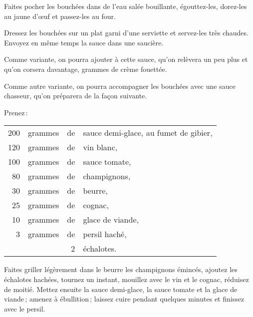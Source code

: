 Faites pocher les bouchées dans de l'eau salée bouillante, égouttez-les,
dorez-les au jaune d'œuf et passez-les au four.

Dressez les bouchées sur un plat garni d'une serviette et servez-les très
chaudes. Envoyez en même temps la sauce dans une saucière.

\sk

Comme variante, on pourra ajouter à cette sauce, qu'on relèvera un peu plus et
qu'on corsera davantage, {\mmm} grammes de crème fouettée.

\sk

Comme autre variante, on pourra accompagner les bouchées avec une sauce
chasseur, qu'on préparera de la façon suivante.

Prenez :

\footnotesize
\begin{longtable}{rrrp{16em}}
    200 & grammes & de & sauce demi-glace, au fumet de gibier,                                            \\
    120 & grammes & de & vin blanc,                                                                       \\
    100 & grammes & de & sauce tomate,                                                                    \\
     80 & grammes & de & champignons,                                                                     \\
     30 & grammes & de & beurre,                                                                          \\
     25 & grammes & de & cognac,                                                                          \\
     10 & grammes & de & glace de viande,                                                                 \\
      3 & grammes & de & persil haché,                                                                    \\
        &         &  2 & échalotes.                                                                       \\
\end{longtable}
\normalsize

Faites griller légèrement dans le beurre les champignons émincés, ajoutez les
échalotes hachées, tournez un instant, mouillez avec le vin et le cognac,
réduisez de moitié. Mettez ensuite la sauce demi-glace, la sauce tomate et la
glace de viande ; amenez à ébullition ; laissez cuire pendant quelques minutes
et finissez avec le persil.

